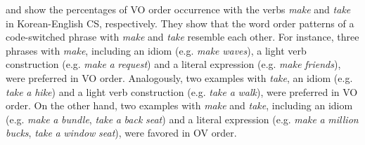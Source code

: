 \begin{table}[b]
\caption{Item-based analysis for \textit{take} in Korean-English code-switching
(n$^0$ of occurrence 0–4: \textsc{ov} biased; 5–9: not biased; 10–14: \textsc{vo} biased)
}
\label{tab:5.8}
\end{table}


 and  show the percentages of \ac{VO} order occurrence with the verbs \textit{make} and \textit{take} in Korean-English \ac{CS}, respectively. They show that the word order patterns of a code-switched phrase with \textit{make} and \textit{take} resemble each other. For instance, three phrases with \textit{make}, including an idiom (e.g. \textit{make} \textit{waves}), a light verb construction (e.g. \textit{make} \textit{a} \textit{request}) and a literal expression (e.g. \textit{make} \textit{friends}), were preferred in \ac{VO} order. Analogously, two examples with \textit{take}, an idiom (e.g. \textit{take} \textit{a} \textit{hike}) and a light verb construction (e.g. \textit{take} \textit{a} \textit{walk}), were preferred in \ac{VO} order. On the other hand, two examples with \textit{make} and \textit{take}, including an idiom (e.g. \textit{make} \textit{a} \textit{bundle}, \textit{take} \textit{a} \textit{back} \textit{seat}) and a literal expression (e.g. \textit{make} \textit{a} \textit{million} \textit{bucks}, \textit{take} \textit{a} \textit{window} \textit{seat}), were favored in \ac{OV} order.





